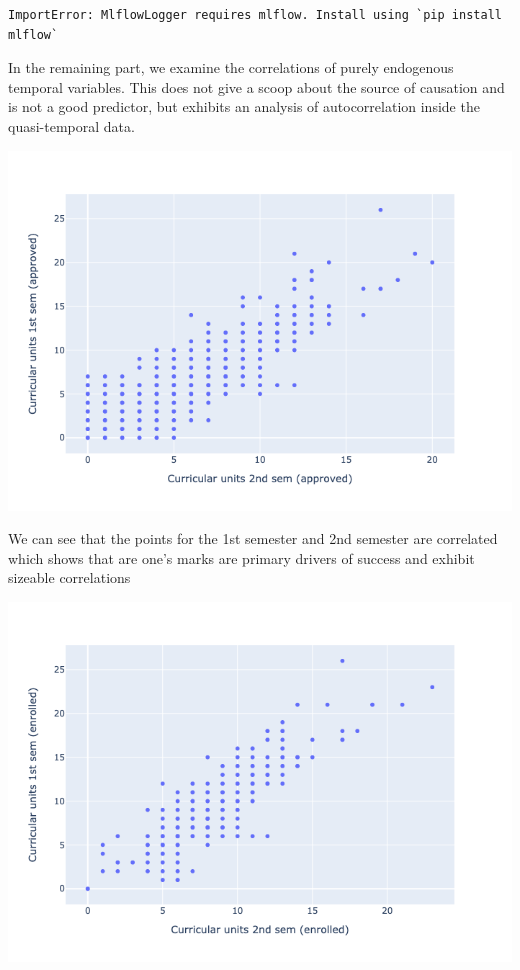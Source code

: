\documentclass[
  letterpaper,
  DIV=11,
  numbers=noendperiod]{scrartcl}
\begin{document}
\begin{verbatim}
ImportError: MlflowLogger requires mlflow. Install using `pip install mlflow`
\end{verbatim}

In the remaining part, we examine the correlations of purely endogenous
temporal variables. This does not give a scoop about the source of
causation and is not a good predictor, but exhibits an analysis of
autocorrelation inside the quasi-temporal data.

\includegraphics{report_AzadhdhinNedalYunisAlFraijat_files/figure-pdf/cell-51-output-1.png}

We can see that the points for the 1st semester and 2nd semester are
correlated which shows that are one's marks are primary drivers of
success and exhibit sizeable correlations

\includegraphics{report_AzadhdhinNedalYunisAlFraijat_files/figure-pdf/cell-52-output-1.png}
\end{document}
